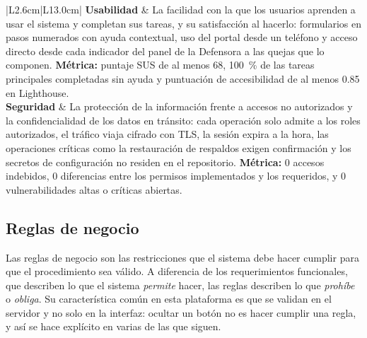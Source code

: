 \begin{longtable}{|L{2.6cm}|L{13.0cm}|}
		\textbf{Usabilidad} & La facilidad con la que los usuarios aprenden a usar el sistema y completan sus tareas, y su satisfacción al hacerlo: formularios en pasos numerados con ayuda contextual, uso del portal desde un teléfono y acceso directo desde cada indicador del panel de la Defensora a las quejas que lo componen. \textbf{Métrica:} puntaje SUS de al menos 68, 100~\% de las tareas principales completadas sin ayuda y puntuación de accesibilidad de al menos 0.85 en Lighthouse. \\ \hline
		\textbf{Seguridad} & La protección de la información frente a accesos no autorizados y la confidencialidad de los datos en tránsito: cada operación solo admite a los roles autorizados, el tráfico viaja cifrado con TLS, la sesión expira a la hora, las operaciones críticas como la restauración de respaldos exigen confirmación y los secretos de configuración no residen en el repositorio. \textbf{Métrica:} 0 accesos indebidos, 0 diferencias entre los permisos implementados y los requeridos, y 0 vulnerabilidades altas o críticas abiertas. \\ \hline
	\end{longtable}
	\normalsize
	\setlength{\tabcolsep}{6pt}
	\renewcommand{\arraystretch}{1}

	\subsection{Reglas de negocio}
	Las reglas de negocio son las restricciones que el sistema debe hacer cumplir para que el
	procedimiento sea válido. A diferencia de los requerimientos funcionales, que describen lo que
	el sistema \emph{permite} hacer, las reglas describen lo que \emph{prohíbe} o \emph{obliga}. Su
	característica común en esta plataforma es que se validan en el servidor y no solo en la
	interfaz: ocultar un botón no es hacer cumplir una regla, y así se hace explícito en varias de
	las que siguen.
	
	\small
	\renewcommand{\arraystretch}{1.2}
	
